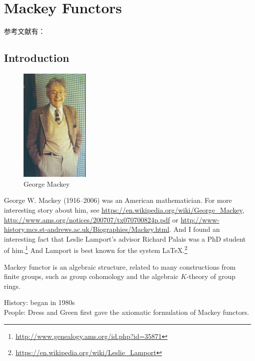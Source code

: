\chapter{Mackey Functors} %
\label{cha:mackey_functors}
参考文献有：\cite{li-2015}

\section{Introduction} %
\label{sec:introduction}
\begin{figure}[htbp]
	\centering
	\includegraphics[width=0.3\textwidth]{./figures/Mackey.jpg}
	\caption{George Mackey}
\end{figure}
George W. Mackey (1916–2006) was an American mathematician. For more interesting story about him, see \url{https://en.wikipedia.org/wiki/George_Mackey}, \url{http://www.ams.org/notices/200707/tx070700824p.pdf} or \url{http://www-history.mcs.st-andrews.ac.uk/Biographies/Mackey.html}. And I found an interesting fact that Leslie Lamport's advisor Richard Palais was a PhD student of him.\footnote{\url{http://www.genealogy.ams.org/id.php?id=35871}} And Lamport is best known for the system \LaTeX.\footnote{\url{https://en.wikipedia.org/wiki/Leslie_Lamport}}


Mackey functor is an algebraic structure, related to many constructions from finite groups, such as group cohomology and the algebraic $K$-theory of group rings.

History: began in 1980s\\
People:  Dress and Green first gave the axiomatic formulation of Mackey functors.







